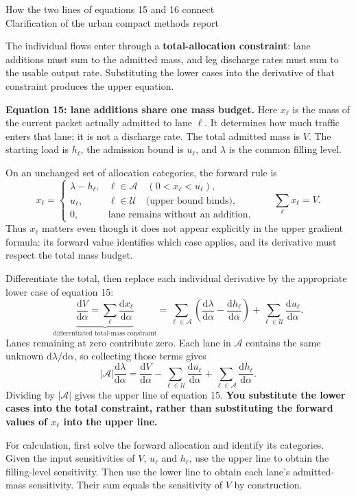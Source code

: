 \documentclass[11pt,a4paper]{article}
\newcommand{\der}[1]{\frac{\mathrm d #1}{\mathrm d\alpha}}
\begin{document}
\begin{center}
{\Large How the two lines of equations 15 and 16 connect}\\[5pt]
{\small Clarification of the urban compact methods report}
\end{center}

The individual flows enter through a \textbf{total-allocation constraint}:
lane additions must sum to the admitted mass, and leg discharge rates must
sum to the usable output rate. Substituting the lower cases into the
derivative of that constraint produces the upper equation.

\textbf{Equation 15: lane additions share one mass budget.}
Here $x_\ell$ is the mass of the current packet actually admitted to lane
$\ell$. It determines how much traffic enters that lane; it is not a
discharge rate. The total admitted mass is $V$.
The starting load is $h_\ell$, the admission bound is $u_\ell$, and
$\lambda$ is the common filling level.

On an unchanged set of allocation categories, the forward rule is
\[
 x_\ell=
 \begin{cases}
 \lambda-h_\ell,&\ell\in\mathcal A\quad(0<x_\ell<u_\ell),\\
 u_\ell,&\ell\in\mathcal U\quad\text{(upper bound binds)},\\
 0,&\text{lane remains without an addition},
 \end{cases}
 \qquad \sum_\ell x_\ell=V.
\]
Thus $x_\ell$ matters even though it does not appear explicitly in the
upper gradient formula: its forward value identifies which case applies,
and its derivative must respect the total mass budget.

Differentiate the total, then replace each individual derivative by the
appropriate lower case of equation 15:
\[
 \underbrace{\der{V}=\sum_\ell\der{x_\ell}}_{\text{differentiated total-mass constraint}}
 =\sum_{\ell\in\mathcal A}
       \left(\der{\lambda}-\der{h_\ell}\right)
  +\sum_{\ell\in\mathcal U}\der{u_\ell}.
\]
Lanes remaining at zero contribute zero. Each lane in $\mathcal A$
contains the same unknown $\mathrm d\lambda/\mathrm d\alpha$, so collecting
those terms gives
\[
 |\mathcal A|\der{\lambda}
 =\der{V}-\sum_{\ell\in\mathcal U}\der{u_\ell}
             +\sum_{\ell\in\mathcal A}\der{h_\ell}.
\]
Dividing by $|\mathcal A|$ gives the upper line of equation 15.
\textbf{You substitute the lower cases into the total constraint, rather
than substituting the forward values of $x_\ell$ into the upper line.}

For calculation, first solve the forward allocation and identify its
categories. Given the input sensitivities of $V$, $u_\ell$ and $h_\ell$,
use the upper line to obtain the filling-level sensitivity. Then use the
lower line to obtain each lane's admitted-mass sensitivity. Their sum
equals the sensitivity of $V$ by construction.
\end{document}

